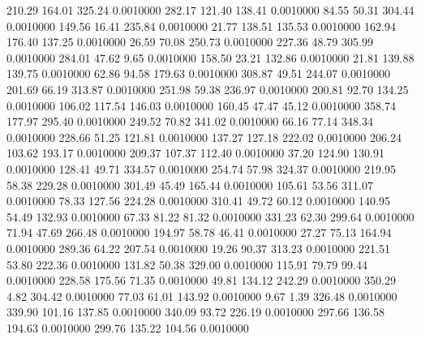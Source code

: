  210.29  164.01  325.24   0.0010000
 282.17  121.40  138.41   0.0010000
  84.55   50.31  304.44   0.0010000
 149.56   16.41  235.84   0.0010000
  21.77  138.51  135.53   0.0010000
 162.94  176.40  137.25   0.0010000
  26.59   70.08  250.73   0.0010000
 227.36   48.79  305.99   0.0010000
 284.01   47.62    9.65   0.0010000
 158.50   23.21  132.86   0.0010000
  21.81  139.88  139.75   0.0010000
  62.86   94.58  179.63   0.0010000
 308.87   49.51  244.07   0.0010000
 201.69   66.19  313.87   0.0010000
 251.98   59.38  236.97   0.0010000
 200.81   92.70  134.25   0.0010000
 106.02  117.54  146.03   0.0010000
 160.45   47.47   45.12   0.0010000
 358.74  177.97  295.40   0.0010000
 249.52   70.82  341.02   0.0010000
  66.16   77.14  348.34   0.0010000
 228.66   51.25  121.81   0.0010000
 137.27  127.18  222.02   0.0010000
 206.24  103.62  193.17   0.0010000
 209.37  107.37  112.40   0.0010000
  37.20  124.90  130.91   0.0010000
 128.41   49.71  334.57   0.0010000
 254.74   57.98  324.37   0.0010000
 219.95   58.38  229.28   0.0010000
 301.49   45.49  165.44   0.0010000
 105.61   53.56  311.07   0.0010000
  78.33  127.56  224.28   0.0010000
 310.41   49.72   60.12   0.0010000
 140.95   54.49  132.93   0.0010000
  67.33   81.22   81.32   0.0010000
 331.23   62.30  299.64   0.0010000
  71.94   47.69  266.48   0.0010000
 194.97   58.78   46.41   0.0010000
  27.27   75.13  164.94   0.0010000
 289.36   64.22  207.54   0.0010000
  19.26   90.37  313.23   0.0010000
 221.51   53.80  222.36   0.0010000
 131.82   50.38  329.00   0.0010000
 115.91   79.79   99.44   0.0010000
 228.58  175.56   71.35   0.0010000
  49.81  134.12  242.29   0.0010000
 350.29    4.82  304.42   0.0010000
  77.03   61.01  143.92   0.0010000
   9.67    1.39  326.48   0.0010000
 339.90  101.16  137.85   0.0010000
 340.09   93.72  226.19   0.0010000
 297.66  136.58  194.63   0.0010000
 299.76  135.22  104.56   0.0010000

